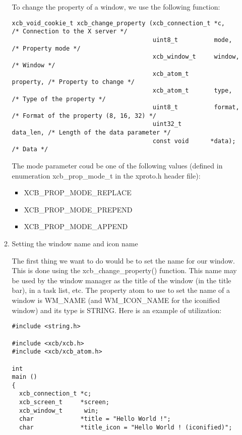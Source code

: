 \documentclass[12pt,oneside,titlepage]{book}
\providecommand{\tightlist}{%
  \setlength{\itemsep}{0pt}\setlength{\parskip}{0pt}}
\begin{document}
\begin{enumerate}
\begin{enumerate}
    To change the property of a window, we use the following function:

\begin{verbatim}
xcb_void_cookie_t xcb_change_property (xcb_connection_t *c,       /* Connection to the X server */
                                       uint8_t          mode,     /* Property mode */
                                       xcb_window_t     window,   /* Window */
                                       xcb_atom_t       property, /* Property to change */
                                       xcb_atom_t       type,     /* Type of the property */
                                       uint8_t          format,   /* Format of the property (8, 16, 32) */
                                       uint32_t         data_len, /* Length of the data parameter */
                                       const void      *data);    /* Data */
\end{verbatim}

    The {mode} parameter coud be one of the following values (defined in
    enumeration xcb\_prop\_mode\_t in the xproto.h header file):

    \begin{itemize}
    \tightlist
    \item
      XCB\_PROP\_MODE\_REPLACE
    \item
      XCB\_PROP\_MODE\_PREPEND
    \item
      XCB\_PROP\_MODE\_APPEND
    \end{itemize}

    \hfill\break
  \item
    \protect\hypertarget{wmname}{}{Setting the window name and icon
    name}

    The first thing we want to do would be to set the name for our
    window. This is done using the {xcb\_change\_property()} function.
    This name may be used by the window manager as the title of the
    window (in the title bar), in a task list, etc. The property atom to
    use to set the name of a window is {WM\_NAME} (and {WM\_ICON\_NAME}
    for the iconified window) and its type is {STRING}. Here is an
    example of utilization:

\begin{verbatim}
#include <string.h>

#include <xcb/xcb.h>
#include <xcb/xcb_atom.h>

int
main ()
{
  xcb_connection_t *c;
  xcb_screen_t     *screen;
  xcb_window_t      win;
  char             *title = "Hello World !";
  char             *title_icon = "Hello World ! (iconified)";




\end{verbatim}
\end{enumerate}
\end{enumerate}
\end{document}
